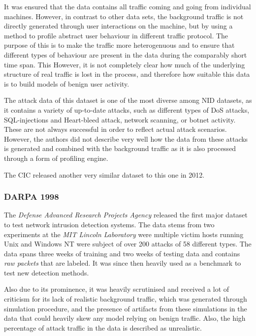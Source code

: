 \documentclass[a4paper,12pt,twoside]{report}
\begin{document}
It was ensured that the data contains all traffic coming and going from individual machines. However, in contrast to other data sets, the background traffic is not directly generated through user interactions on the machine, but by using a method to profile abstract user behaviour in different traffic protocol. The purpose of this is to make the traffic more heterogenuous and to ensure that different types of behaviour are present in the data during the comparably short time span. This  However, it is not completely clear how much of the underlying structure of real traffic is lost in the process, and therefore how suitable this data is to build models of benign user activity.

The attack data of this dataset is one of the most diverse among NID datasets, as it contains a variety of up-to-date attacks, such as different types of DoS attacks, SQL-injections and Heart-bleed attack, network scanning, or botnet activity. These are not always successful in order to reflect actual attack scenarios. However, the authors did not describe very well how the data from these attacks is generated and combined with the background traffic as it is also processed through a form of profiling engine. 

The CIC released another very similar dataset to this one in 2012.

\subsubsection*{DARPA 1998 \cite{lippmann2000evaluating}}

The \textit{Defense Advanced Research Projects Agency} released the first major dataset to test network intrusion detection systems. The data stems from two experiments at the \textit{MIT Lincoln Laboratory} were multiple victim hosts running Unix and Windows NT were subject of over 200 attacks of 58 different types. The data spans three weeks of training and two weeks of testing data and contains \textit{raw packets} that are labeled. It was since then heavily used as a benchmark to test new detection methods. %

Also due to its prominence, it was heavily scrutinised and received a lot of criticism for its lack of realistic background traffic, which was generated through simulation procedure, and the presence of artifacts from these simulations in the data that could heavily skew any model relying on benign traffic. Also, the high percentage of attack traffic in the data is described as unrealistic.
\end{document}
